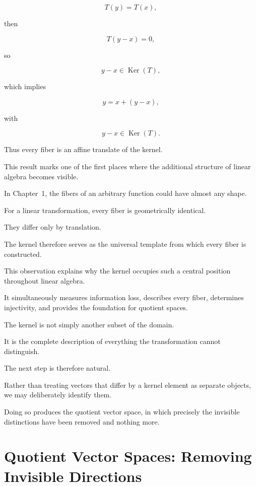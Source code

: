 \documentclass[11pt]{book}
\numberwithin{equation}{chapter}
\theoremstyle{definition}
\theoremstyle{plain}
\theoremstyle{remark}
\DeclareMathOperator{\Ker}{Ker}
\begin{document}
\[
T(y)=T(x),
\]

then

\[
T(y-x)=0,
\]

so

\[
y-x\in\Ker(T),
\]

which implies

\[
y=x+(y-x),
\]

with

\[
y-x\in\Ker(T).
\]

Thus every fiber is an affine translate of the kernel.

This result marks one of the first places where the additional structure of linear algebra becomes visible.

In Chapter~1, the fibers of an arbitrary function could have almost any shape.

For a linear transformation, every fiber is geometrically identical.

They differ only by translation.

The kernel therefore serves as the universal template from which every fiber is constructed.

This observation explains why the kernel occupies such a central position throughout linear algebra.

It simultaneously measures information loss, describes every fiber, determines injectivity, and provides the foundation for quotient spaces.

The kernel is not simply another subset of the domain.

It is the complete description of everything the transformation cannot distinguish.

The next step is therefore natural.

Rather than treating vectors that differ by a kernel element as separate objects, we may deliberately identify them.

Doing so produces the quotient vector space, in which precisely the invisible distinctions have been removed and nothing more.


\section{Quotient Vector Spaces: Removing Invisible Directions}
\end{document}
